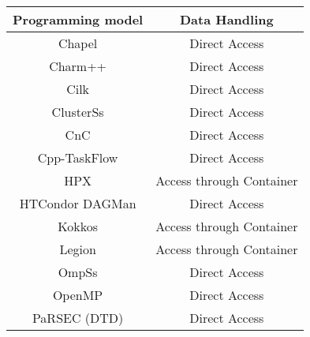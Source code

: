 \begin{tabular}{cc}
\hline
Programming model & Data Handling \\
\hline
Chapel & Direct Access\\
Charm++ & Direct Access\\
Cilk & Direct Access\\
ClusterSs & Direct Access\\
CnC & Direct Access\\
Cpp-TaskFlow & Direct Access\\
HPX & Access through Container\\
HTCondor DAGMan & Direct Access\\
Kokkos & Access through Container\\
Legion & Access through Container\\
OmpSs & Direct Access\\
OpenMP & Direct Access\\
PaRSEC (DTD) & Direct Access\\
\hline
\end{tabular}
